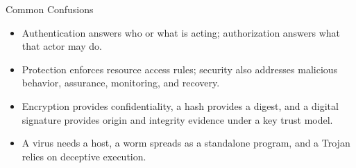 \documentclass[10pt,letterpaper]{article}
\begin{document}
\begin{studybox}{Common Confusions}
\begin{itemize}
  \item Authentication answers who or what is acting; authorization answers what that actor may do.
  \item Protection enforces resource access rules; security also addresses malicious behavior, assurance, monitoring, and recovery.
  \item Encryption provides confidentiality, a hash provides a digest, and a digital signature provides origin and integrity evidence under a key trust model.
  \item A virus needs a host, a worm spreads as a standalone program, and a Trojan relies on deceptive execution.
\end{itemize}
\end{studybox}
\end{document}
